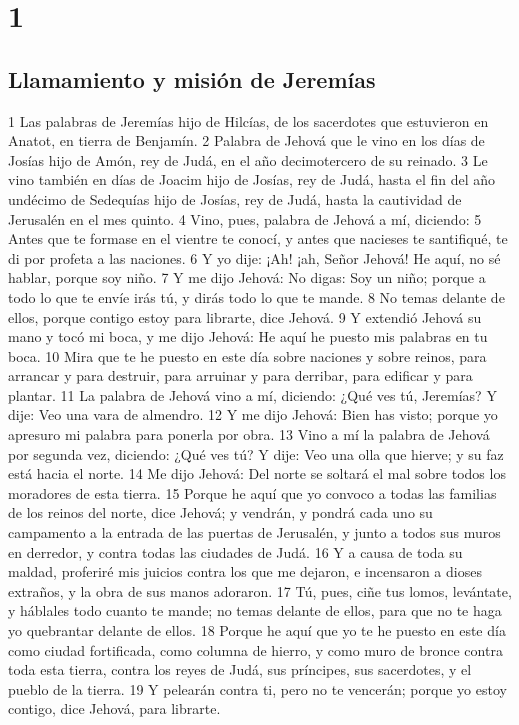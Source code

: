
\chapter{1}

\section*{Llamamiento y misión de Jeremías}

1 Las palabras de Jeremías hijo de Hilcías, de los sacerdotes que estuvieron en Anatot, en tierra de Benjamín.
2 Palabra de Jehová que le vino en los días de Josías hijo de Amón, rey de Judá, en el año decimotercero de su reinado.
3 Le vino también en días de Joacim hijo de Josías, rey de Judá, hasta el fin del año undécimo de Sedequías hijo de Josías, rey de Judá, hasta la cautividad de Jerusalén en el mes quinto.
4 Vino, pues, palabra de Jehová a mí, diciendo:
5 Antes que te formase en el vientre te conocí, y antes que nacieses te santifiqué, te di por profeta a las naciones.
6 Y yo dije: ¡Ah! ¡ah, Señor Jehová! He aquí, no sé hablar, porque soy niño.
7 Y me dijo Jehová: No digas: Soy un niño; porque a todo lo que te envíe irás tú, y dirás todo lo que te mande.
8 No temas delante de ellos, porque contigo estoy para librarte, dice Jehová.
9 Y extendió Jehová su mano y tocó mi boca, y me dijo Jehová: He aquí he puesto mis palabras en tu boca.
10 Mira que te he puesto en este día sobre naciones y sobre reinos, para arrancar y para destruir, para arruinar y para derribar, para edificar y para plantar.
11 La palabra de Jehová vino a mí, diciendo: ¿Qué ves tú, Jeremías? Y dije: Veo una vara de almendro.
12 Y me dijo Jehová: Bien has visto; porque yo apresuro mi palabra para ponerla por obra.
13 Vino a mí la palabra de Jehová por segunda vez, diciendo: ¿Qué ves tú? Y dije: Veo una olla que hierve; y su faz está hacia el norte.
14 Me dijo Jehová: Del norte se soltará el mal sobre todos los moradores de esta tierra.
15 Porque he aquí que yo convoco a todas las familias de los reinos del norte, dice Jehová; y vendrán, y pondrá cada uno su campamento a la entrada de las puertas de Jerusalén, y junto a todos sus muros en derredor, y contra todas las ciudades de Judá.
16 Y a causa de toda su maldad, proferiré mis juicios contra los que me dejaron, e incensaron a dioses extraños, y la obra de sus manos adoraron.
17 Tú, pues, ciñe tus lomos, levántate, y háblales todo cuanto te mande; no temas delante de ellos, para que no te haga yo quebrantar delante de ellos.
18 Porque he aquí que yo te he puesto en este día como ciudad fortificada, como columna de hierro, y como muro de bronce contra toda esta tierra, contra los reyes de Judá, sus príncipes, sus sacerdotes, y el pueblo de la tierra.
19 Y pelearán contra ti, pero no te vencerán; porque yo estoy contigo, dice Jehová, para librarte.

